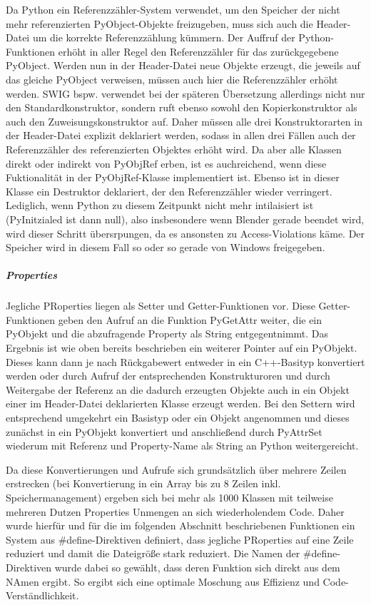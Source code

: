 Da Python ein Referenzzähler-System verwendet, um den Speicher der nicht mehr referenzierten PyObject-Objekte freizugeben, muss sich auch die Header-Datei um die korrekte Referenzzählung kümmern. Der Auffruf der Python-Funktionen erhöht in aller Regel den Referenzzähler für das zurückgegebene PyObject. Werden nun in der Header-Datei neue Objekte erzeugt, die jeweils auf das gleiche PyObject verweisen, müssen auch hier die Referenzzähler erhöht werden. SWIG bspw. verwendet bei der späteren Übersetzung allerdings nicht nur den Standardkonstruktor, sondern ruft ebenso sowohl den Kopierkonstruktor als auch den Zuweisungskonstruktor auf. Daher müssen alle drei Konstruktorarten in der Header-Datei explizit deklariert werden, sodass in allen drei Fällen auch der Referenzzähler des referenzierten Objektes erhöht wird. Da aber alle Klassen direkt oder indirekt von PyObjRef erben, ist es auchreichend, wenn diese Fuktionalität in der PyObjRef-Klasse implementiert ist. Ebenso ist in dieser Klasse ein Destruktor deklariert, der den Referenzzähler wieder verringert. Lediglich, wenn Python zu diesem Zeitpunkt nicht mehr intilaisiert ist (PyInitzialed ist dann null), also insbesondere wenn Blender gerade beendet wird, wird dieser Schritt übersrpungen, da es ansonsten zu Access-Violations käme. Der Speicher wird in diesem Fall so oder so gerade von Windows freigegeben.

\subparagraph{Properties}

Jegliche PRoperties liegen als Setter und Getter-Funktionen vor. Diese Getter-Funktionen geben den Aufruf an die Funktion PyGetAttr weiter, die ein PyObjekt und die abzufragende Property als String entgegentnimmt. Das Ergebnis ist wie oben bereits beschrieben ein weiterer Pointer auf ein PyObjekt. Dieses kann dann je nach Rückgabewert entweder in ein C++-Basityp konvertiert werden oder durch Aufruf der entsprechenden Konstrukturoren und durch Weitergabe der Referenz an die dadurch erzeugten Objekte auch in ein Objekt einer im Header-Datei deklarierten Klasse erzeugt werden. Bei den Settern wird entsprechend umgekehrt ein Basistyp oder ein Objekt angenommen und dieses zunächst in ein PyObjekt konvertiert und anschließend durch PyAttrSet wiederum mit Referenz und Property-Name als String an Python weitergereicht.

Da diese Konvertierungen und Aufrufe sich grundsätzlich über mehrere Zeilen erstrecken (bei Konvertierung in ein Array bis zu 8 Zeilen inkl. Speichermanagement) ergeben sich bei mehr als 1000 Klassen mit teilweise mehreren Dutzen Properties Unmengen an sich wiederholendem Code. Daher wurde hierfür und für die im folgenden Abschnitt beschriebenen Funktionen ein System aus \#define-Direktiven definiert, dass jegliche PRoperties auf eine Zeile reduziert und damit die Dateigröße stark reduziert. Die Namen der \#define-Direktiven wurde dabei so gewählt, dass deren Funktion sich direkt aus dem NAmen ergibt. So ergibt sich eine optimale Moschung aus Effizienz und Code-Verständlichkeit.

